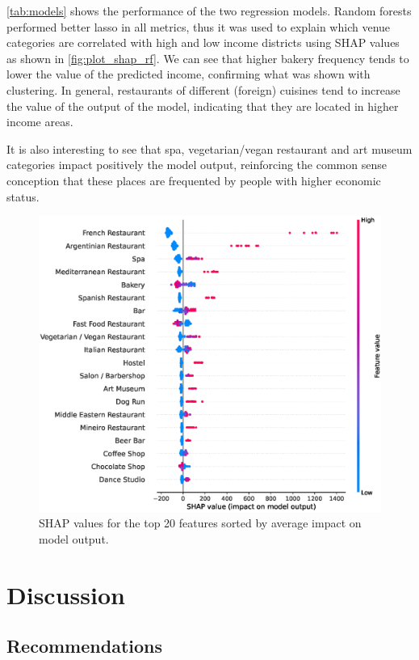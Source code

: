 \documentclass[12pt]{article}
\begin{document}
\autoref{tab:models} shows the performance of the two regression models. Random
forests performed better lasso in all metrics, thus it was used to explain
which venue categories are correlated with high and low income districts using
SHAP values as shown in \autoref{fig:plot_shap_rf}. We can see that higher
bakery frequency tends to lower the value of the predicted income, confirming
what was shown with clustering. In general, restaurants of different (foreign)
cuisines tend to increase the value of the output of the model, indicating that
they are located in higher income areas.

It is also interesting to see that spa, vegetarian/vegan restaurant and art
museum categories impact positively the model output, reinforcing the common
sense conception that these places are frequented by people with higher
economic status.

\begin{figure}[h]
        \centering
        \includegraphics[width=\linewidth]{plot_rf_shap.eps}
        \caption{SHAP values for the top 20 features sorted by average impact
        on model output.\label{fig:plot_shap_rf}}
\end{figure}



\section{Discussion}

\subsection{Recommendations}
\end{document}

